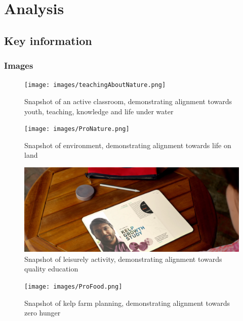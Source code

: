 \section{Analysis} 

\subsection{Key information}

\subsubsection*{Images}
\begin{figure}[H]
    \centering
    \texttt{[image: images/teachingAboutNature.png]}
    \caption{Snapshot of an active classroom, demonstrating alignment towards youth, teaching, knowledge and life under water}
    \label{fig:teach}
\end{figure}  

\begin{figure}[H]
    \centering
    \texttt{[image: images/ProNature.png]}
    \caption{Snapshot of environment, demonstrating alignment towards life on land}
    \label{fig:nature}
\end{figure}  

\begin{figure}[H]
    \centering
    \includegraphics[width=1\textwidth]{images/ProSocialTeamwork.png}
    \caption{Snapshot of leisurely activity, demonstrating alignment towards quality education}
    \label{fig:edu}
\end{figure}  

\begin{figure}[H]
    \centering
    \texttt{[image: images/ProFood.png]}
    \caption{Snapshot of kelp farm planning, demonstrating alignment towards zero hunger}
    \label{fig:food}
\end{figure}  

